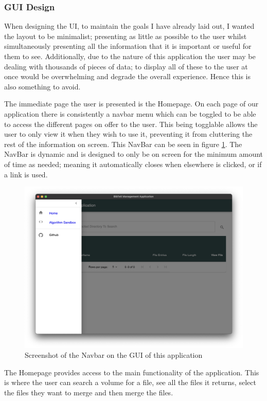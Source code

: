 \documentclass[a4paper,11pt]{article}
\begin{document}
\subsubsection{GUI Design}
When designing the UI, to maintain the goals I have already laid out, I wanted the layout to be minimalist; presenting as little as possible to the user whilst simultaneously presenting all the information that it is important or useful for them to see. Additionally, due to the nature of this application the user may be dealing with thousands of pieces of data; to display all of these to the user at once would be overwhelming and degrade the overall experience. Hence this is also something to avoid.

The immediate page the user is presented is the Homepage. On each page of our application there is consistently a navbar menu which can be toggled to be able to access the different pages on offer to the user. This being togglable allows the user to only view it when they wish to use it, preventing it from cluttering the rest of the information on screen. This NavBar can be seen in figure \ref{fig:navbarScreenshot}. The NavBar is dynamic and is designed to only be on screen for the minimum amount of time as needed; meaning it automatically closes when elsewhere is clicked, or if a link is used.

\begin{figure}
    \centering
    \includegraphics[width=0.8\linewidth]{images/navbar.png}
    \caption{Screenshot of the Navbar on the GUI of this application}
    \label{fig:navbarScreenshot}
\end{figure}

The Homepage provides access to the main functionality of the application. This is where the user can search a volume for a file, see all the files it returns, select the files they want to merge and then merge the files.
\end{document}
